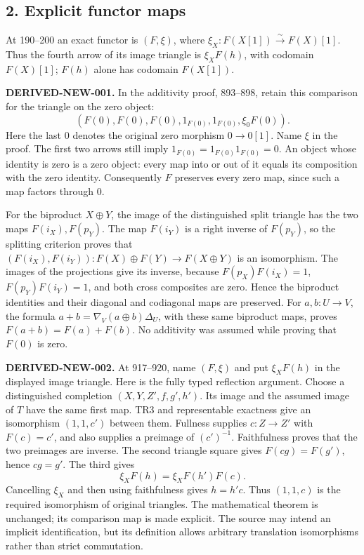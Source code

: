 \subsection{2. Explicit functor maps}\label{proofs-0001-1140-explicit-functor-maps}

At 190–\allowbreak{}200 an exact functor is \((F,\xi)\),\allowbreak{} where \(\xi_X:F(X[1])\xrightarrow{\sim}F(X)[1]\). Thus the fourth arrow of its image triangle is \(\xi_XF(h)\),\allowbreak{} with codomain \(F(X)[1]\); \(F(h)\) alone has codomain \(F(X[1])\).

\textbf{DERIVED-NEW-001.} In the additivity proof,\allowbreak{} 893–\allowbreak{}898,\allowbreak{} retain this comparison for the triangle on the zero object:\allowbreak{} \[
(F(0),F(0),F(0),1_{F(0)},1_{F(0)},\xi_0F(0)).
\] Here the last \(0\) denotes the original zero morphism \(0\to0[1]\). Name \(\xi\) in the proof. The first two arrows still imply \(1_{F(0)}=1_{F(0)}1_{F(0)}=0\). An object whose identity is zero is a zero object:\allowbreak{} every map into or out of it equals its composition with the zero identity. Consequently \(F\) preserves every zero map,\allowbreak{} since such a map factors through \(0\).

For the biproduct \(X\oplus Y\),\allowbreak{} the image of the distinguished split triangle has the two maps \(F(i_X),F(p_Y)\). The map \(F(i_Y)\) is a right inverse of \(F(p_Y)\),\allowbreak{} so the splitting criterion proves that \((F(i_X),F(i_Y)):F(X)\oplus F(Y)\to F(X\oplus Y)\) is an isomorphism. The images of the projections give its inverse,\allowbreak{} because \(F(p_X)F(i_X)=1\),\allowbreak{} \(F(p_Y)F(i_Y)=1\),\allowbreak{} and both cross composites are zero. Hence the biproduct identities and their diagonal and codiagonal maps are preserved. For \(a,b:U\to V\),\allowbreak{} the formula \(a+b=\nabla_V(a\oplus b)\Delta_U\),\allowbreak{} with these same biproduct maps,\allowbreak{} proves \(F(a+b)=F(a)+F(b)\). No additivity was assumed while proving that \(F(0)\) is zero.

\textbf{DERIVED-NEW-002.} At 917–\allowbreak{}920,\allowbreak{} name \((F,\xi)\) and put \(\xi_XF(h)\) in the displayed image triangle. Here is the fully typed reflection argument. Choose a distinguished completion \((X,Y,Z',f,g',h')\). Its image and the assumed image of \(T\) have the same first map. TR3 and representable exactness give an isomorphism \((1,1,c')\) between them. Fullness supplies \(c:Z\to Z'\) with \(F(c)=c'\),\allowbreak{} and also supplies a preimage of \((c')^{-1}\). Faithfulness proves that the two preimages are inverse. The second triangle square gives \(F(cg)=F(g')\),\allowbreak{} hence \(cg=g'\). The third gives \[
\xi_XF(h)=\xi_XF(h')F(c).
\] Cancelling \(\xi_X\) and then using faithfulness gives \(h=h'c\). Thus \((1,1,c)\) is the required isomorphism of original triangles. The mathematical theorem is unchanged; its comparison map is made explicit. The source may intend an implicit identification,\allowbreak{} but its definition allows arbitrary translation isomorphisms rather than strict commutation.

